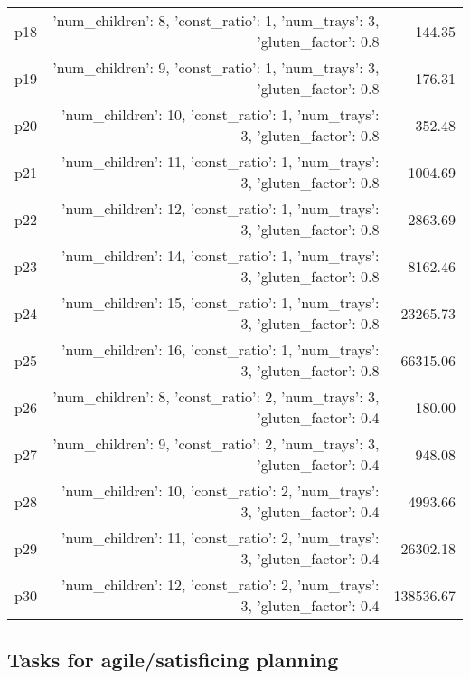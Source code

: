 \documentclass{article}
\begin{document}
\begin{center}
\begin{tabular}{@{}l|r|r@{}}
  p18&{'num\_children': 8, 'const\_ratio': 1, 'num\_trays': 3, 'gluten\_factor': 0.8}&144.35\\
  p19&{'num\_children': 9, 'const\_ratio': 1, 'num\_trays': 3, 'gluten\_factor': 0.8}&176.31\\
  p20&{'num\_children': 10, 'const\_ratio': 1, 'num\_trays': 3, 'gluten\_factor': 0.8}&352.48\\
  p21&{'num\_children': 11, 'const\_ratio': 1, 'num\_trays': 3, 'gluten\_factor': 0.8}&1004.69\\
  p22&{'num\_children': 12, 'const\_ratio': 1, 'num\_trays': 3, 'gluten\_factor': 0.8}&2863.69\\
  p23&{'num\_children': 14, 'const\_ratio': 1, 'num\_trays': 3, 'gluten\_factor': 0.8}&8162.46\\
  p24&{'num\_children': 15, 'const\_ratio': 1, 'num\_trays': 3, 'gluten\_factor': 0.8}&23265.73\\
  p25&{'num\_children': 16, 'const\_ratio': 1, 'num\_trays': 3, 'gluten\_factor': 0.8}&66315.06\\
  p26&{'num\_children': 8, 'const\_ratio': 2, 'num\_trays': 3, 'gluten\_factor': 0.4}&180.00\\
  p27&{'num\_children': 9, 'const\_ratio': 2, 'num\_trays': 3, 'gluten\_factor': 0.4}&948.08\\
  p28&{'num\_children': 10, 'const\_ratio': 2, 'num\_trays': 3, 'gluten\_factor': 0.4}&4993.66\\
  p29&{'num\_children': 11, 'const\_ratio': 2, 'num\_trays': 3, 'gluten\_factor': 0.4}&26302.18\\
  p30&{'num\_children': 12, 'const\_ratio': 2, 'num\_trays': 3, 'gluten\_factor': 0.4}&138536.67
                            \end{tabular}
                            \end{center}
                    

                                \subsection*{Tasks for agile/satisficing planning}
                                
\end{document}
